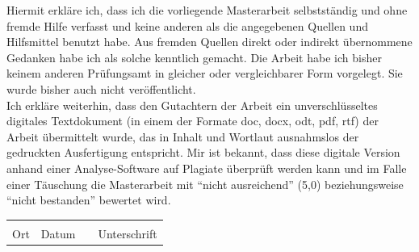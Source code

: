 \documentclass[
	pdftex,
	oneside,
	12pt,
	parskip=half,
]{scrreprt}
\begin{document}
    Hiermit erkläre ich, dass ich die vorliegende Masterarbeit selbstständig und ohne fremde Hilfe verfasst und keine anderen als die angegebenen Quellen und Hilfsmittel benutzt habe. Aus fremden Quellen direkt oder indirekt übernommene Gedanken habe ich als solche kenntlich gemacht. Die Arbeit habe ich bisher keinem anderen Prüfungsamt in gleicher oder vergleichbarer Form vorgelegt. Sie wurde bisher auch nicht veröffentlicht.\\[2cm]

    Ich erkläre weiterhin, dass den Gutachtern der Arbeit ein unverschlüsseltes digitales Textdokument (in einem der Formate doc, docx, odt, pdf, rtf) der Arbeit übermittelt wurde, das in Inhalt und Wortlaut ausnahmslos der gedruckten Ausfertigung entspricht. Mir ist bekannt, dass diese digitale Version anhand einer Analyse-Software auf Plagiate überprüft werden kann und im Falle einer Täuschung die Masterarbeit mit “nicht ausreichend” (5,0) beziehungsweise “nicht bestanden” bewertet wird.\\[2cm]

    \begin{tabular}{ p{3cm}p{3cm}p{1cm}p{5cm} }
        \hrulefill & \hrulefill & & \hrulefill\\
        Ort & Datum & & Unterschrift\\
    \end{tabular}

    \newpage

    \tableofcontents

    \newpage

    

    \newpage

    
    

	\clearpage
	
\end{document}
